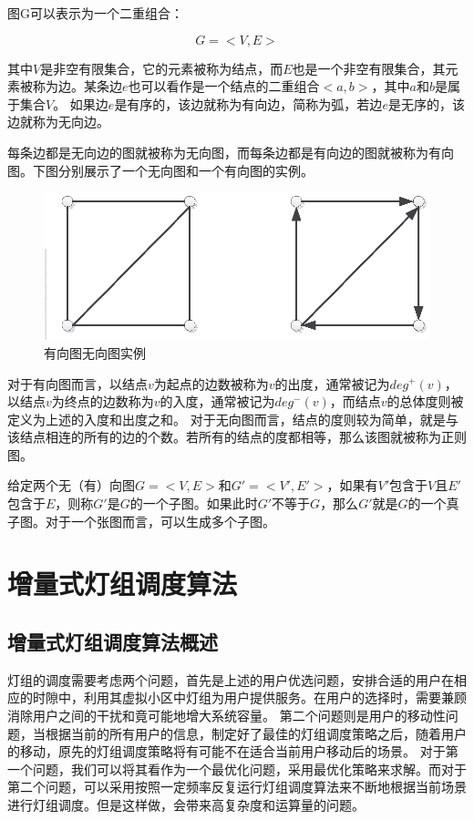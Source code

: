 图G可以表示为一个二重组合：

\begin{equation}
    G =  < V,E >
\end{equation}

其中$V$是非空有限集合，它的元素被称为结点，而$E$也是一个非空有限集合，其元素被称为边。某条边$e$也可以看作是一个结点的二重组合$<a,b>$，其中$a$和$b$是属于集合$V$。
如果边$e$是有序的，该边就称为有向边，简称为弧，若边$e$是无序的，该边就称为无向边。

每条边都是无向边的图就被称为无向图，而每条边都是有向边的图就被称为有向图。下图分别展示了一个无向图和一个有向图的实例。

\begin{figure}[htbp]
    \centering
	\includegraphics[width=\textwidth]{figures/chapter-5/GraphExample.eps}
	\caption{有向图无向图实例}
	\label{fig:graph-example}
\end{figure}

对于有向图而言，以结点$v$为起点的边数被称为$v$的出度，通常被记为$deg^{+}(v)$，以结点$v$为终点的边数称为$v$的入度，通常被记为$deg^{-}(v)$，而结点$v$的总体度则被定义为上述的入度和出度之和。
对于无向图而言，结点的度则较为简单，就是与该结点相连的所有的边的个数。若所有的结点的度都相等，那么该图就被称为正则图。

给定两个无（有）向图$G=<V, E>$和$G'=<V',E'>$，如果有$V'$包含于$V$且$E'$包含于$E$，则称$G'$是$G$的一个子图。如果此时$G'$不等于$G$，那么$G'$就是$G$的一个真子图。对于一个张图而言，可以生成多个子图。

\section{增量式灯组调度算法}\label{sec:incremental-schdule-scheme}
\subsection{增量式灯组调度算法概述}
灯组的调度需要考虑两个问题，首先是上述的用户优选问题，安排合适的用户在相应的时隙中，利用其虚拟小区中灯组为用户提供服务。在用户的选择时，需要兼顾消除用户之间的干扰和竟可能地增大系统容量。
第二个问题则是用户的移动性问题，当根据当前的所有用户的信息，制定好了最佳的灯组调度策略之后，随着用户的移动，原先的灯组调度策略将有可能不在适合当前用户移动后的场景。
对于第一个问题，我们可以将其看作为一个最优化问题，采用最优化策略来求解。而对于第二个问题，可以采用按照一定频率反复运行灯组调度算法来不断地根据当前场景进行灯组调度。但是这样做，会带来高复杂度和运算量的问题。

